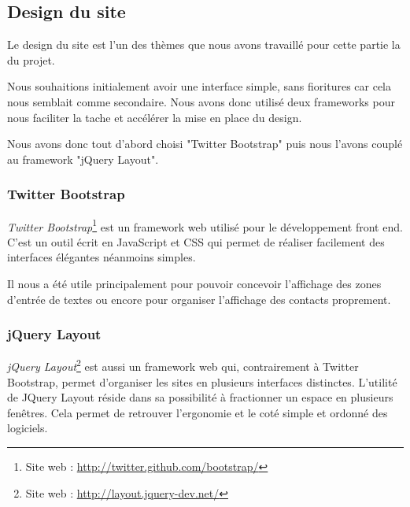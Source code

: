 
\subsection{Design du site}

Le design du site est l'un des thèmes que nous avons travaillé pour cette partie la du projet.

Nous souhaitions initialement avoir une interface simple, sans fioritures car cela nous semblait comme
secondaire. Nous avons donc utilisé deux frameworks pour nous faciliter la tache et accélérer la mise
en place du design.

Nous avons donc tout d'abord choisi "Twitter Bootstrap" puis nous l'avons couplé au framework "jQuery
Layout".


\subsubsection{Twitter Bootstrap}

\textit{Twitter Bootstrap}\footnote{Site web : \href{http://twitter.github.com/bootstrap/}{http://twitter.github.com/bootstrap/}} est un framework web utilisé pour le développement front end.
C'est un outil écrit en JavaScript et CSS qui permet de réaliser facilement des interfaces élégantes néanmoins simples. 

Il nous a été utile principalement pour pouvoir concevoir l'affichage des zones d'entrée de textes ou 
encore pour organiser l'affichage des contacts proprement.


\subsubsection{jQuery Layout}

\textit{jQuery Layout}\footnote{Site web : \href{http://layout.jquery-dev.net/}{http://layout.jquery-dev.net/}} est aussi un framework web qui, contrairement à Twitter Bootstrap, permet d'organiser les sites en plusieurs interfaces distinctes. 
L'utilité de JQuery Layout réside dans sa possibilité à fractionner un espace en plusieurs fenêtres.
Cela permet de retrouver l'ergonomie et le coté simple et ordonné des logiciels. 

